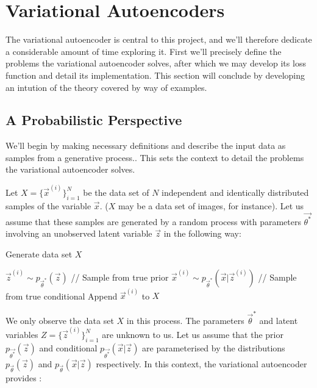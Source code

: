 %
%
%
%
%
\section{Variational Autoencoders}
\label{sec:variational_autoencoders}
\cite{Kingma2014}

The variational autoencoder is central to this project, and we'll therefore dedicate a considerable amount of time exploring it. First we'll precisely define the problems the variational autoencoder solves, after which we may develop its loss function and detail its implementation. This section will conclude by developing an intution of the theory covered by way of examples.

\subsection{A Probabilistic Perspective}
We'll begin by making necessary definitions and describe the input data as samples from a generative process.. This sets the context to detail the problems the variational autoencoder solves.

Let $X = \{\vec{x}^{(i)}\}_{i=1}^{N}$ be the data set of $N$ independent and identically distributed samples of the variable $\vec{x}$. ($X$ may be a data set of images, for instance). Let us assume that these samples are generated by a random process with parameters $\vec{\theta^*}$ involving an unobserved latent variable $\vec{z}$ in the following way:\\

\begin{algorithm}
  \caption{Generate data set $X$}
  \begin{algorithmic}[1]
      \State $\vec{z}^{(i)} \sim p_{\vec{\theta}^*}(\vec{z})$ \quad\quad\quad\quad\quad\quad\quad\quad\quad\quad // Sample from true prior
      \State $\vec{x}^{(i)} \sim p_{\vec{\theta}^*}(\vec{x} | \vec{z}^{(i)})$ \quad\quad\quad\quad\quad\quad\quad\enspace\enspace\thinspace // Sample from true conditional
      \State Append $\vec{x}^{(i)}$ to $X$
  \EndFor
  \end{algorithmic}
  \label{alg:generate_data_set_x}
\end{algorithm}

We only observe the data set $X$ in this process. The parameters $\vec{\theta}^*$ and latent variables $Z = \{ \vec{z}^{(i)} \}_{i=1}^{N}$ are unknown to us. Let us assume that the prior $p_{\vec{\theta^*}}(\vec{z})$ and conditional $p_{\vec{\theta^*}}(\vec{x}|\vec{z})$ are parameterised by the distributions $p_{\vec{\theta}}(\vec{z})$ and $p_{\vec{\theta}}(\vec{x}|\vec{z})$ respectively. In this context, the variational autoencoder provides \cite{Kingma2014}:

